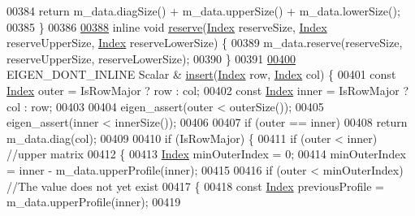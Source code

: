 \begin{DoxyCode}
00384         \textcolor{keywordflow}{return} m\_data.diagSize() + m\_data.upperSize() + m\_data.lowerSize();
00385     \}
00386 
\hyperlink{class_eigen_1_1_skyline_matrix_aac6da20a87fca9d4cb6b871504497577}{00388}     \textcolor{keyword}{inline} \textcolor{keywordtype}{void} \hyperlink{class_eigen_1_1_skyline_matrix_aac6da20a87fca9d4cb6b871504497577}{reserve}(\hyperlink{group___core___module_a554f30542cc2316add4b1ea0a492ff02}{Index} reserveSize, \hyperlink{group___core___module_a554f30542cc2316add4b1ea0a492ff02}{Index} reserveUpperSize, 
      \hyperlink{group___core___module_a554f30542cc2316add4b1ea0a492ff02}{Index} reserveLowerSize) \{
00389         m\_data.reserve(reserveSize, reserveUpperSize, reserveLowerSize);
00390     \}
00391 
\hyperlink{class_eigen_1_1_skyline_matrix_a6e2d550f29d0dd59f83aa9d568d92c23}{00400}     EIGEN\_DONT\_INLINE Scalar & \hyperlink{class_eigen_1_1_skyline_matrix_a6e2d550f29d0dd59f83aa9d568d92c23}{insert}(\hyperlink{group___core___module_a554f30542cc2316add4b1ea0a492ff02}{Index} row, \hyperlink{group___core___module_a554f30542cc2316add4b1ea0a492ff02}{Index} col) \{
00401         \textcolor{keyword}{const} \hyperlink{group___core___module_a554f30542cc2316add4b1ea0a492ff02}{Index} outer = IsRowMajor ? row : col;
00402         \textcolor{keyword}{const} \hyperlink{group___core___module_a554f30542cc2316add4b1ea0a492ff02}{Index} inner = IsRowMajor ? col : row;
00403 
00404         eigen\_assert(outer < outerSize());
00405         eigen\_assert(inner < innerSize());
00406 
00407         \textcolor{keywordflow}{if} (outer == inner)
00408             \textcolor{keywordflow}{return} m\_data.diag(col);
00409 
00410         \textcolor{keywordflow}{if} (IsRowMajor) \{
00411             \textcolor{keywordflow}{if} (outer < inner) \textcolor{comment}{//upper matrix}
00412             \{
00413                 \hyperlink{group___core___module_a554f30542cc2316add4b1ea0a492ff02}{Index} minOuterIndex = 0;
00414                 minOuterIndex = inner - m\_data.upperProfile(inner);
00415 
00416                 \textcolor{keywordflow}{if} (outer < minOuterIndex) \textcolor{comment}{//The value does not yet exist}
00417                 \{
00418                     \textcolor{keyword}{const} \hyperlink{group___core___module_a554f30542cc2316add4b1ea0a492ff02}{Index} previousProfile = m\_data.upperProfile(inner);
00419 

\end{DoxyCode}
